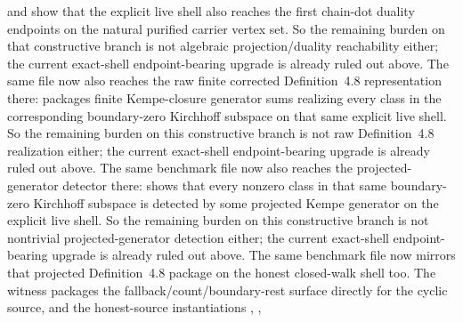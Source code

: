 \documentclass[11pt]{article}
\begin{document}
\begin{itemize}
and
show that the explicit live shell also reaches the first chain-dot duality
endpoints on the natural purified carrier vertex set.  So the remaining burden
on that constructive branch is not algebraic projection/duality reachability
either; the current exact-shell endpoint-bearing upgrade is already ruled out
above.
The same file now also reaches the raw finite corrected Definition~4.8
representation there:
packages finite Kempe-closure generator sums realizing every class in the
corresponding boundary-zero Kirchhoff subspace on that same explicit live shell.
So the remaining burden on this constructive branch is not raw
Definition~4.8 realization either; the current exact-shell endpoint-bearing
upgrade is already ruled out above.  The same benchmark file now also reaches the
projected-generator detector there:
shows that every nonzero class in that same boundary-zero Kirchhoff subspace is
detected by some projected Kempe generator on the explicit live shell.  So the
remaining burden on this constructive branch is not nontrivial
projected-generator detection either; the current exact-shell endpoint-bearing
upgrade is already ruled out above.
The same benchmark file now mirrors that projected Definition~4.8 package on
the honest closed-walk shell too.  The witness
packages the fallback/count/boundary-rest surface directly for the cyclic
source, and the honest-source instantiations
,
,

\end{itemize}
\end{document}
